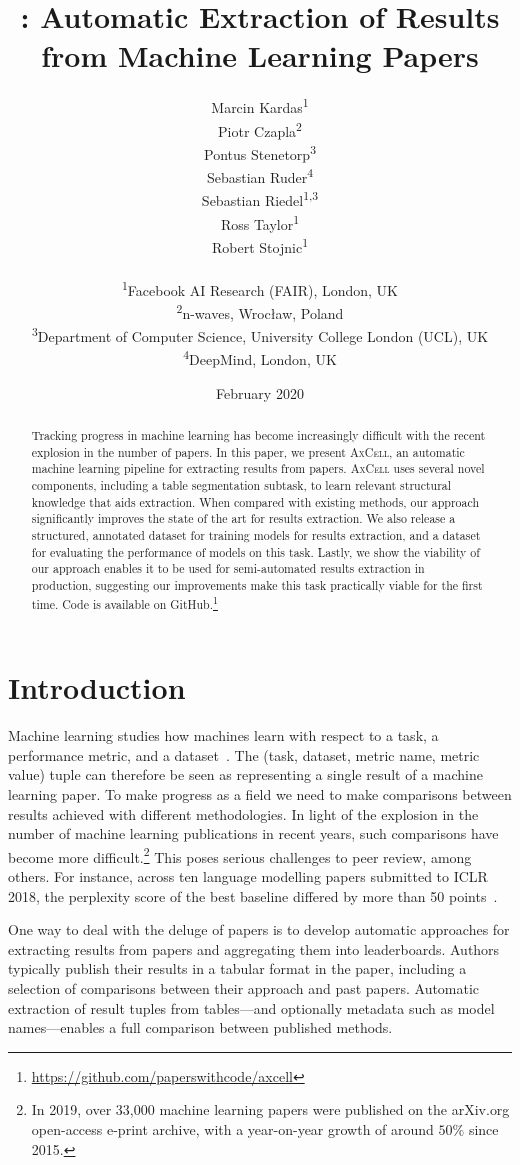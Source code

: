 \documentclass[11pt,a4paper]{article}
\title{\model{}: Automatic Extraction of Results\\from Machine Learning Papers}
\author{
  Marcin Kardas\textsuperscript{1}\\\And
  Piotr Czapla\textsuperscript{2}\\\And
  Pontus Stenetorp\textsuperscript{3}\\\AND
  Sebastian Ruder\textsuperscript{4}\\\And
  Sebastian Riedel\textsuperscript{1,3}\\\And
  Ross Taylor\textsuperscript{1}\\\And
  Robert Stojnic\textsuperscript{1}\\\AND\\
  \textsuperscript{1}Facebook AI Research (FAIR), London, UK\\
  \textsuperscript{2}n-waves, Wroc{\l}aw, Poland\\
  \textsuperscript{3}Department of Computer Science, University College London (UCL), UK\\
  \textsuperscript{4}DeepMind, London, UK\\
}
\date{February 2020}
\newcommand{\model}{\textsc{AxCell}}
\newcommand{\arxiv}{arXiv.org}
\newcommand{\anonurl}[1]{\url{#1}}
\newcommand{\anonurl}[1]{\url{https://ANONYMIZED}}
\begin{document}
\setlength{\belowcaptionskip}{-12pt}
\addtolength{\textfloatsep}{-0.15in}

\maketitle

\begin{abstract}
 Tracking progress in machine learning has become increasingly difficult with the recent explosion in the number of papers. In this paper, we present \model{}, an automatic machine learning pipeline for extracting results from papers. \model{} uses several novel components, including a table segmentation subtask, to learn relevant structural knowledge that aids extraction. When compared with existing methods, our approach significantly improves the state of the art for results extraction. We also release a structured, annotated dataset for training models for results extraction, and a dataset for evaluating the performance of models on this task. Lastly, we show the viability of our approach enables it to be used for semi-automated results extraction in production, suggesting our improvements make this task practically viable for the first time.
  Code is available on GitHub.\footnote{\anonurl{https://github.com/paperswithcode/axcell}}
 
\end{abstract} \section{Introduction}
Machine learning studies how machines learn with respect to a task, a performance metric, and a dataset~\citep{mitchell2006}.  The (task, dataset, metric name, metric value) tuple can therefore be seen as representing a single result of a machine learning paper. To make progress as a field we need to make comparisons between results achieved with different methodologies. In light of the explosion in the number of machine learning publications in recent years, such comparisons have become more difficult.\footnote{In 2019, over 33,000 machine learning papers were published on the \arxiv{} open-access e-print archive, with a year-on-year growth of around $50\%$ since 2015.} This poses serious challenges to peer review, among others. For instance, across ten language modelling papers submitted to ICLR 2018, the perplexity score of the best baseline differed by more than 50 points~\cite{Ruder2018}.

One way to deal with the deluge of papers is to develop automatic approaches for extracting results from papers and aggregating them into leaderboards.
Authors typically publish their results in a tabular format in the paper, including a selection of comparisons between their approach and past papers. Automatic extraction of result tuples from tables---and optionally metadata such as model names---enables a full comparison between published methods.
\end{document}
